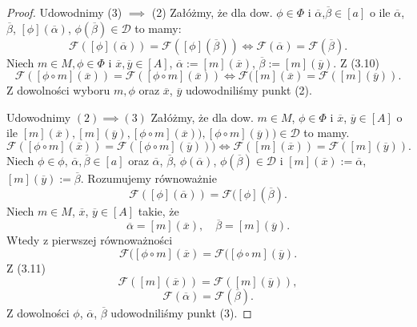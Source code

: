 \documentclass[12pt,a4paper]{report}
\newcommand{\domkniecie}[1]{\left[ {#1} \right] }
\begin{document}
\begin{proof}
Udowodnimy (3) $\implies$ (2)
Załóżmy, że dla dow. $\phi \in \Phi$ i $\overline{\alpha}$,$ \overline{\beta} \in \domkniecie{a}$ o ile $\overline{\alpha}$, $\overline{\beta}$, $\domkniecie{\phi}(\overline{\alpha})$, $\phi(\overline{\beta}) \in \mathcal{D}$ to mamy:
\begin{equation}
\mathcal{F}(\domkniecie{\phi}(\overline{\alpha}))=\mathcal{F}(\domkniecie{\phi}(\overline{\beta})) \iff \mathcal{F}(\overline{\alpha})=\mathcal{F}(\overline{\beta}).
\end{equation}
Niech $m\in M, \phi\in \Phi$ i $\overline{x}, \overline{y} \in \domkniecie{A}$, $\overline{\alpha}:=\domkniecie{m}(\overline{x})$, $\overline{\beta}:=\domkniecie{m}(\overline{y})$. Z (3.10)
$$
\mathcal{F}(\domkniecie{\phi\circ m}(\overline{x}))=\mathcal{F}(\domkniecie{\phi\circ m}(\overline{x})) \iff \mathcal{F}(\domkniecie{m} (\overline{x})=\mathcal{F}(\domkniecie{m}(\overline{y})).
$$
Z dowolności wyboru $m, \phi$ oraz $\overline{x}$, $\overline{y}$ udowodniliśmy punkt (2).

Udowodnimy $(2) \implies (3)$
Załóżmy, że dla dow. $m \in M$, $\phi \in \Phi$ i $\overline{x}$, $\overline{y} \in \domkniecie{A}$ o ile $\domkniecie{m}(\overline{x}), \domkniecie{
m}(\overline{y}), \domkniecie{\phi\circ m}(\overline{x})), \domkniecie{\phi\circ m}(\overline{y})) \in \mathcal{D}$ to mamy.
\begin{equation}
\mathcal{F}(\domkniecie{\phi \circ m}(\overline{x}))=\mathcal{F}(\domkniecie{\phi \circ m}(\overline{y}))) \iff \mathcal{F}(\domkniecie{m}(\overline{x}))=\mathcal{F}(\domkniecie{m}(\overline{y})).
\end{equation}
Niech $\phi \in \phi$, $\overline{\alpha}, \overline{\beta} \in \domkniecie{a}$ oraz $\overline{\alpha}$, $\overline{\beta}$, $\phi(\overline{\alpha})$, $\phi(\overline{\beta}) \in \mathcal{D}$ i $\domkniecie{m}(\overline{x}):=\overline{\alpha}$,  $\domkniecie{m}(\overline{y}):=\overline{\beta}$. 
Rozumujemy równoważnie
$$
\mathcal{F}(\domkniecie{\phi}(\overline{\alpha}))=\mathcal{F}(\domkniecie{\phi}(\overline{\beta}).
$$
Niech $m \in M$, $\overline{x}$, $\overline{y} \in \domkniecie{A}$ takie, że
$$
\overline{\alpha}=\domkniecie{m}(\overline{x}), \quad \overline{\beta}=\domkniecie{m}(\overline{y}).
$$
Wtedy z pierwszej równoważności
$$
\mathcal{F}(\domkniecie{\phi \circ m}(\overline{x})=\mathcal{F}(\domkniecie{\phi \circ m}(\overline{y}).
$$
Z (3.11)
$$
\mathcal{F}(\domkniecie{m}(\overline{x}))=\mathcal{F}(\domkniecie{m}(\overline{y})), 
$$
$$
\mathcal{F}(\overline{\alpha})=\mathcal{F}(\overline{\beta}).
$$
Z dowolności $\phi$, $\overline{\alpha}$, $\overline{\beta}$ udowodniliśmy punkt (3).
\end{proof}
\end{document}
